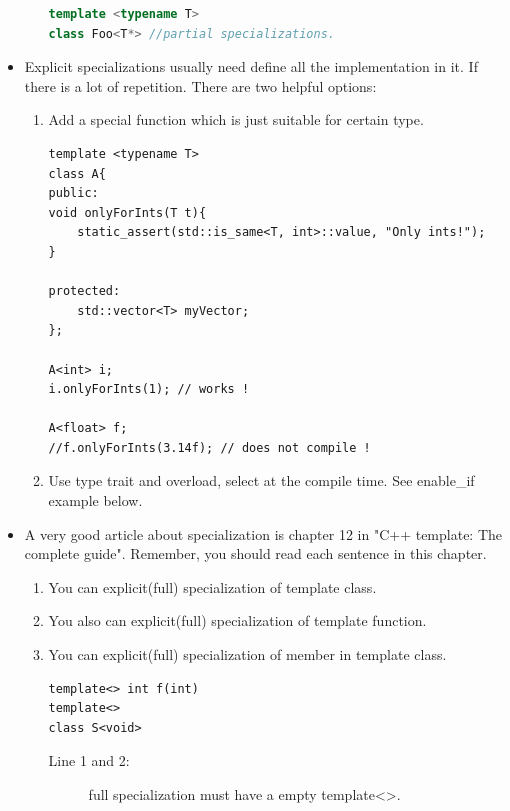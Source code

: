 \documentclass[a4paper,11pt,twoside]{book}
\begin{document}
\begin{itemize}
\begin{enumerate}
\begin{lstlisting}[frame=single, language=c++]
template <typename T>
class Foo<T*> //partial specializations.
\end{lstlisting}

\end{enumerate}

\item Explicit specializations usually need define all the implementation in it. If there is a lot of repetition. There are two helpful options: 
\begin{enumerate}
	\item Add a special function which is just suitable for certain type. 
\begin{lstlisting}[numbers=none]
template <typename T>
class A{
public:
void onlyForInts(T t){
	static_assert(std::is_same<T, int>::value, "Only ints!");
}

protected:
	std::vector<T> myVector;
};

A<int> i;
i.onlyForInts(1); // works !

A<float> f;
//f.onlyForInts(3.14f); // does not compile !
\end{lstlisting}

\item Use type trait and overload, select at the compile time. See enable\_if example below.

\end{enumerate}

\item A very good article about specialization is chapter 12 in "C++ template: The complete guide". Remember, you should read each sentence in this chapter.
\begin{enumerate}
	\item You can explicit(full) specialization of template class. 
	\item You also can explicit(full) specialization of template function. 
	\item You can explicit(full) specialization of member in template class. 
\begin{lstlisting}
template<> int f(int)
template<> 
class S<void>
\end{lstlisting}
\begin{description}
	\item[Line 1 and 2:] full specialization must have a empty template<>.
\end{description}


\end{enumerate}
\end{itemize}
\end{document}
